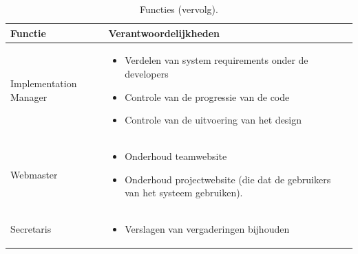 \begin{table} [H]
	\centering
	\caption{Functies (vervolg).}
	\begin{tabular} {l | p{10cm}}
		Functie & Verantwoordelijkheden \\
		\hline
		Implementation Manager &
		\begin{itemize}
		\item Verdelen van system requirements onder de developers
		\item Controle van de progressie van de code
		\item Controle van de uitvoering van het design
		\end{itemize}\\
		\hline
		Webmaster &
		\begin{itemize}
		\item Onderhoud teamwebsite
		\item Onderhoud projectwebsite (die dat de gebruikers van het systeem gebruiken).
		\end{itemize}\\
		\hline
		Secretaris &
		\begin{itemize}
		\item Verslagen van vergaderingen bijhouden
		\end{itemize}\\
	\end{tabular}
\end{table}